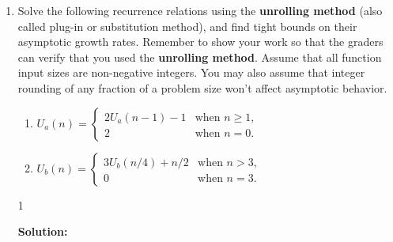 \documentclass[9pt]{article}
\def\solutions{1}
\begin{document}
\begin{enumerate}

\item Solve the following recurrence relations using the \textbf{unrolling method} (also called plug-in or substitution method), and find tight bounds on their asymptotic growth rates.  Remember to show your work so that the graders can verify that you used the \textbf{unrolling method}.  Assume that all function input sizes are non-negative integers.  You may also assume that integer rounding of any fraction of a problem size won't affect asymptotic behavior.
  \begin{enumerate}
  \item $U_a(n) = \begin{cases}
    2U_a(n-1)-1 & \text{when } n\ge1,\\
    2 & \text{when } n=0.
  \end{cases}$
  \item $U_b(n) = \begin{cases}
    3U_b(n/4)+n/2 & \text{when } n>3,\\
    0 & \text{when } n=3.
  \end{cases}$
  \end{enumerate}

\if\solutions1
\vspace{2mm}

\textbf{Solution:}   \\


\fi

\newpage




\end{enumerate}
\end{document}
